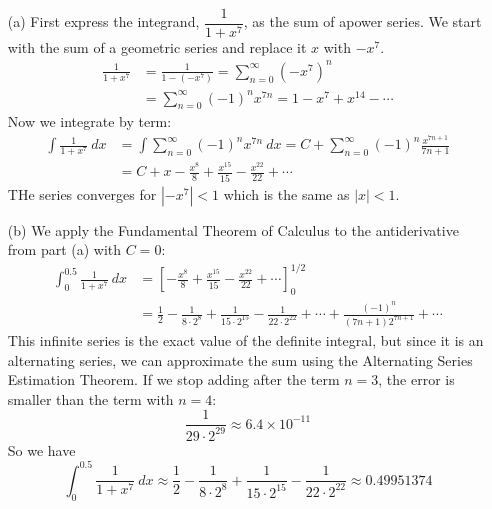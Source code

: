     \begin{solution}
      \hphantom{ }\\
      \begin{enumerate}
        \item[(a)] First express the integrand, $\dfrac{1}{1+x^7}$, as the sum of apower series. We start with the sum of a geometric series and replace it $x$ with $-x^7$.
        \begin{align*}
          \frac{1}{1+x^7} &= \frac{1}{1-(-x^7)} = \sum_{n=0}^{\infty} (-x^7)^n \\
          &= \sum_{n=0}^{\infty} (-1)^n x^{7n} = 1 - x^7 + x^{14} - \cdots
        \end{align*}
        Now we integrate by term:
        \begin{align*}
          \int \frac{1}{1+x^7}\ dx &= \int \sum_{n=0}^{\infty} (-1)^n x^{7n}\ dx = C + \sum_{n=0}^{\infty} (-1)^n \frac{x^{7n+1}}{7n+1} \\
          &= C+ x - \frac{x^8}{8} + \frac{x^{15}}{15} - \frac{x^{22}}{22} + \cdots
        \end{align*}
        THe series converges for $|-x^7|<1$ which is the same as $|x|<1$.
        \item[(b)] We apply the Fundamental Theorem of Calculus to the antiderivative from part (a) with $C=0$:
        \begin{align*}
          \int_{0}^{0.5} \frac{1}{1+x^7}\ dx &= \left[ - \frac{x^8}{8} + \frac{x^{15}}{15} - \frac{x^{22}}{22} + \cdots \right]_{0}^{1/2} \\
          &= \frac{1}{2} - \frac{1}{8 \cdot 2^8} + \frac{1}{15 \cdot 2^{15}} - \frac{1}{22 \cdot 2^{22}} + \cdots + \frac{(-1)^n}{(7n+1)2^{7n+1}} + \cdots
        \end{align*}
        This infinite series is the exact value of the definite integral, but since it is an alternating series, we can approximate the sum using the Alternating Series Estimation Theorem. If we stop adding after the term $n=3$, the error is smaller than the term with $n=4$:
        $$\frac{1}{29 \cdot 2^29} \approx 6.4 \times 10^{-11} $$
        So we have
        $$ \int_{0}^{0.5} \frac{1}{1+x^7}\ dx \approx \frac{1}{2} - \frac{1}{8 \cdot 2^8} + \frac{1}{15 \cdot 2^{15}} - \frac{1}{22 \cdot 2^{22}} \approx 0.49951374 $$
      \end{enumerate}
    \end{solution}

